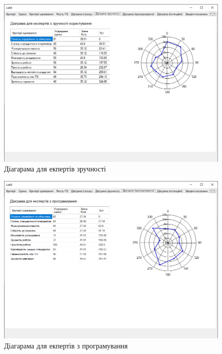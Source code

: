\documentclass[14pt]{extreport}
\begin{document}
\begin{normalsize}
\begin{figure}[H]
	\centering
	\includegraphics[scale=0.55]{6}
	\caption{Діагарама для екпертів зручності}
\end{figure}

\begin{figure}[H]
	\centering
	\includegraphics[scale=0.55]{7}
	\caption{Діагарама для екпертів з програмування}
\end{figure}


\end{normalsize}
\end{document}
